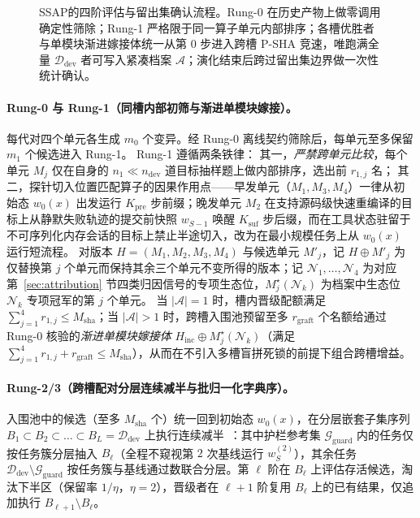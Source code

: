 \documentclass[UTF8,a4paper,10.5pt]{ctexart}
\newcommand{\method}{SSAP}
\newcommand{\Ddev}{\mathcal{D}_{\mathrm{dev}}}
\begin{document}
\begin{figure}[t]
\caption{\method{}的四阶评估与留出集确认流程。Rung-0 在历史产物上做零调用确定性筛除；Rung-1 严格限于同一算子单元内部排序；各槽优胜者与单模块渐进嫁接体统一从第 0 步进入跨槽 P-SHA 竞速，唯跑满全量 $\Ddev$ 者可写入紧凑档案 $\mathcal{A}$；演化结束后跨过留出集边界做一次性统计确认。}
\label{fig:pipeline}
\end{figure}

\paragraph{Rung-0 与 Rung-1（同槽内部初筛与渐进单模块嫁接）。}
每代对四个单元各生成 $m_0$ 个变异。经 Rung-0 离线契约筛除后，每单元至多保留 $m_1$ 个候选进入 Rung-1。
Rung-1 遵循两条铁律：
其一，\emph{严禁跨单元比较}，每个单元 $M_j$ 仅在自身的 $n_1\ll n_{\mathrm{dev}}$ 道目标抽样题上做内部排序，选出前 $r_{1,j}$ 名；
其二，探针切入位置匹配算子的因果作用点——早发单元（$M_1,M_3,M_4$）一律从初始态 $w_0(x)$ 出发运行 $K_{\mathrm{pre}}$ 步前缀；晚发单元 $M_2$ 在支持源码级快速重编译的目标上从静默失败轨迹的提交前快照 $w_{S-1}$ 唤醒 $K_{\mathrm{suf}}$ 步后缀，而在工具状态驻留于不可序列化内存会话的目标上禁止半途切入，改为在最小规模任务上从 $w_0(x)$ 运行短流程。
对版本 $H=(M_1,M_2,M_3,M_4)$ 与候选单元 $M'_j$，记 $H\oplus M'_j$ 为仅替换第 $j$ 个单元而保持其余三个单元不变所得的版本；记 $\mathcal{N}_1,\dots,\mathcal{N}_4$ 为对应第~\ref{sec:attribution} 节四类归因信号的专项生态位，$M_j^\star(\mathcal{N}_k)$ 为档案中生态位 $\mathcal{N}_k$ 专项冠军的第 $j$ 个单元。
当 $|\mathcal{A}|=1$ 时，槽内晋级配额满足 $\sum_{j=1}^4 r_{1,j}\le M_{\mathrm{sha}}$；当 $|\mathcal{A}|>1$ 时，跨槽入围池预留至多 $r_{\mathrm{graft}}$ 个名额给通过 Rung-0 核验的\emph{渐进单模块嫁接体} $H_{\mathrm{inc}}\oplus M_j^\star(\mathcal{N}_k)$（满足 $\sum_{j=1}^4 r_{1,j}+r_{\mathrm{graft}}\le M_{\mathrm{sha}}$），从而在不引入多槽盲拼死锁的前提下组合跨槽增益。

\paragraph{Rung-2/3（跨槽配对分层连续减半与批归一化字典序）。}
入围池中的候选（至多 $M_{\mathrm{sha}}$ 个）统一回到初始态 $w_0(x)$，在分层嵌套子集序列 $B_1\subset B_2\subset\dots\subset B_L=\Ddev$ 上执行连续减半~\cite{sha}：其中护栏参考集 $\mathcal{G}_{\mathrm{guard}}$ 内的任务仅按任务簇分层抽入 $B_\ell$（全程不窥视第 $2$ 次基线运行 $w^{(2)}_S$），其余任务 $\Ddev\setminus\mathcal{G}_{\mathrm{guard}}$ 按任务簇与基线通过数联合分层。第 $\ell$ 阶在 $B_\ell$ 上评估存活候选，淘汰下半区（保留率 $1/\eta$，$\eta=2$），晋级者在 $\ell+1$ 阶复用 $B_\ell$ 上的已有结果，仅追加执行 $B_{\ell+1}\setminus B_\ell$。
\end{document}
